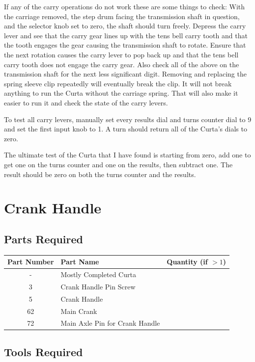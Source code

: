 \documentclass[openany]{book}
\begin{document}
If any of the carry operations do not work these are some things to check:
With the carriage removed, the step drum facing the transmission shaft in question, and the selector knob set to zero, the shaft should turn freely.
Depress the carry lever and see that the carry gear lines up with the tens bell carry tooth and that the tooth engages the gear causing the transmission shaft to rotate.
Ensure that the next rotation causes the carry lever to pop back up and that the tens bell carry tooth does not engage the carry gear.
Also check all of the above on the transmission shaft for the next less significant digit.
Removing and replacing the spring sleeve clip repeatedly will eventually break the clip. It will not break anything to run the Curta without the carriage spring. That will also make it easier to run it and check the state of the carry levers.

To test all carry levers, manually set every results dial and turns counter dial to 9 and set the first input knob to 1. A turn should return all of the Curta’s dials to zero.

The ultimate test of the Curta that I have found is starting from zero, add one to get one on the turns counter and one on the results, then subtract one. The result should be zero on both the turns counter and the results.



\chapter{Crank Handle}
\section{Parts Required}
\begin{table}[!ht]
	\centering
	\begin{tabular}{clc}
		Part Number & Part Name & Quantity (if $>1$) \\ \hline
		- & Mostly Completed Curta & \\
		3 & Crank Handle Pin Screw & \\
		5 & Crank Handle & \\
		62 & Main Crank & \\
		72 & Main Axle Pin for Crank Handle
	\end{tabular}
\end{table}

\section{Tools Required}
\end{document}
